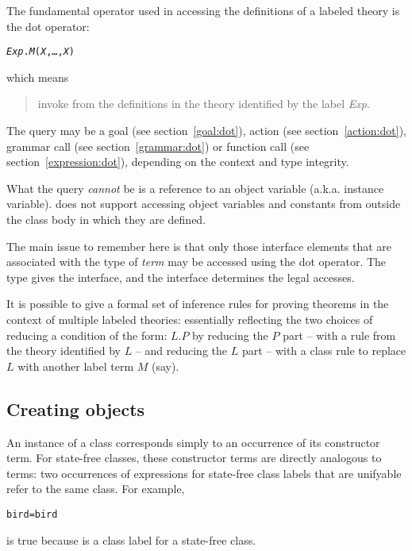The fundamental operator used in accessing the definitions of a labeled theory is the dot operator:
\begin{alltt}
\emph{Exp}.\emph{M}(\emph{X},\ldots,\emph{X\subn})
\end{alltt}
which means
\begin{quote}
invoke  from the definitions in the theory identified by the label \emph{Exp}.
\end{quote}

The query  may be a goal (see section~\vref{goal:dot}), action (see section~\vref{action:dot}), grammar call (see section~\vref{grammar:dot}) or function call (see section~\vref{expression:dot}), depending on the context and type integrity. 
\begin{aside}
What the query \emph{cannot} be is a reference to an object variable (a.k.a. instance variable). \go does not support accessing object variables and constants from outside the class body in which they are defined.
\end{aside}

The main issue to remember here is that only those interface elements that are associated with the type of \emph{term} may be accessed using the dot operator. The type gives the interface, and the interface determines the legal accesses.

It is possible to give a formal set of inference rules for proving theorems in the context of multiple labeled theories: essentially reflecting the two choices of reducing a condition of the form: $L.P$ by reducing the $P$ part -- with a rule from the theory identified by $L$ -- and reducing the $L$ part -- with a class rule to replace $L$ with another label term $M$ (say).

\subsection{Creating objects}
\label{objects:create}

An instance of a class corresponds simply to an occurrence of its constructor term. For state-free classes, these constructor terms are directly analogous to \prolog terms: two occurrences of expressions for state-free class labels that are unifyable refer to the same class. For example, 
\begin{alltt}
bird=bird
\end{alltt}
is true because  is a class label for a state-free class.

